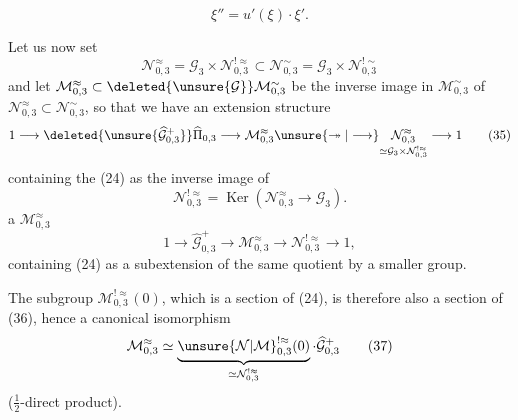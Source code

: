 
\[
\xi''=u'(\xi)\cdot\xi'.
\tag{33}
\]

Let us now set
\[
\mathcal N_{0,3}^{\approx}
=\mathcal G_3\times\mathcal N_{0,3}^{!\approx}
\subset\mathcal N_{0,3}^{\sim}
=\mathcal G_3\times\mathcal N_{0,3}^{!\sim}
\tag{34}
\]
and let $\mathcal M_{0,3}^{\approx}\subset\deleted{\unsure{\mathcal G}}\mathcal M_{0,3}^{\sim}$ be the inverse image in $\mathcal M_{0,3}^{\sim}$ of $\mathcal N_{0,3}^{\approx}\subset\mathcal N_{0,3}^{\sim}$, so that we have an extension structure
\[
1\longrightarrow\deleted{\unsure{\widehat{\mathcal G}_{0,3}^{+}}}\widehat\Pi_{0,3}
\longrightarrow\mathcal M_{0,3}^{\approx}
\unsure{\twoheadrightarrow|\longrightarrow}
\underset{\simeq\mathcal G_3\times\mathcal N_{0,3}^{!\approx}}{\mathcal N_{0,3}^{\approx}}
\longrightarrow1
\tag{35}
\]
containing the  (24) as the inverse image of 
\[
\mathcal N_{0,3}^{!\approx}
=\operatorname{Ker}(\mathcal N_{0,3}^{\approx}\longrightarrow\mathcal G_3).
\]
   a   $\mathcal M_{0,3}^{\approx}$
\[
1\longrightarrow\widehat{\mathcal G}_{0,3}^{+}
\longrightarrow\mathcal M_{0,3}^{\approx}
\longrightarrow\mathcal N_{0,3}^{!\approx}\longrightarrow1,
\tag{36}
\]
containing (24) as a subextension of the same quotient by a smaller group.

The subgroup $\mathcal M_{0,3}^{!\approx}(0)$, which is a section of (24), is therefore also a section of (36), hence a canonical isomorphism
\[
\mathcal M_{0,3}^{\approx}
\simeq\underbrace{\unsure{\mathcal N|\mathcal M}_{0,3}^{!\approx}(0)}_{\simeq\mathcal N_{0,3}^{!\approx}}
\cdot\widehat{\mathcal G}_{0,3}^{+}
\tag{37}
\]
($\frac12$-direct product).


